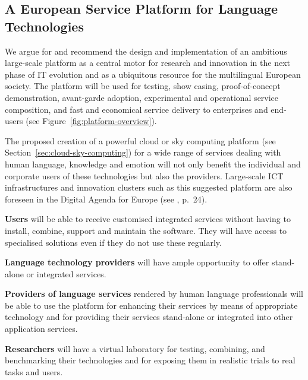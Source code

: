 \documentclass[10pt, plain]{../../metanetpaper}
\begin{document}
\begin{multicols}{2}

\subsection{A European Service Platform for Language Technologies}
\label{sec:europ-service-platform}

%

We argue for and recommend the design and implementation of an ambitious large-scale platform as a central motor for research and innovation in the next phase of IT evolution and as a ubiquitous resource for the multilingual European society. The platform will be used for testing, show casing, proof-of-concept demonstration, avant-garde adoption, experimental and operational service composition, and fast and economical service delivery to enterprises and end-users (see Figure~\ref{fig:platform-overview}).
 
The proposed creation of a powerful cloud or sky computing platform (see Section~\ref{sec:cloud-sky-computing}) for a wide range of services dealing with human language, knowledge and emotion will not only benefit the individual and corporate users of these technologies but also the providers. Large-scale ICT infrastructures and innovation clusters such as this suggested platform are also foreseen in the Digital Agenda for Europe (see \cite{DA2010}, p.~24).
 
\textbf{Users} will be able to receive customised integrated services without having to install, combine, support and maintain the software. They will have access to specialised solutions even if they do not use these regularly.
 
\textbf{Language technology providers} will have ample opportunity to offer stand-alone or integrated services.
 
\textbf{Providers of language services} rendered by human language professionals will be able to use the platform for enhancing their services by means of appropriate technology and for providing their services stand-alone or integrated into other application services.
 
\textbf{Researchers} will have a virtual laboratory for testing, combining, and benchmarking their technologies and for exposing them in realistic trials to real tasks and users.
 

\end{multicols}
\end{document}
